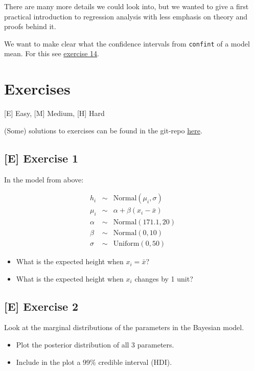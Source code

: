 \documentclass[
]{book}
\providecommand{\tightlist}{%
  \setlength{\itemsep}{0pt}\setlength{\parskip}{0pt}}
\begin{document}
There are many more details we could look into, but we wanted to give a first
practical introduction to regression analysis with less emphasis on theory and proofs behind it.

We want to make clear what the confidence intervals from \texttt{confint} of a model mean. For this see
\hyperref[exercise14_simpl_lin_reg]{exercise 14}.

\section{Exercises}\label{exercises-1}

{[}E{]} Easy, {[}M{]} Medium, {[}H{]} Hard

(Some) solutions to exercises can be found in the git-repo \href{https://github.com/jdegenfellner/Script_QM2_ZHAW/tree/main/Solutions_Exercises}{here}.

\subsection{{[}E{]} Exercise 1}\label{exercise1_simpl_lin_reg}

In the model from above:

\begin{eqnarray*}
h_i &\sim& \text{Normal}(\mu_i, \sigma)\\
\mu_i &\sim& \alpha + \beta (x_i - \bar{x})\\
\alpha &\sim& \text{Normal}(171.1, 20)\\
\beta &\sim& \text{Normal}(0, 10)\\
\sigma &\sim& \text{Uniform}(0, 50)
\end{eqnarray*}

\begin{itemize}
\tightlist
\item
  What is the expected height when \(x_i = \bar{x}\)?
\item
  What is the expected height when \(x_i\) changes by 1 unit?
\end{itemize}

\subsection{{[}E{]} Exercise 2}\label{exercise2_simpl_lin_reg}

Look at the marginal distributions of the parameters in the Bayesian model.

\begin{itemize}
\tightlist
\item
  Plot the posterior distribution of all 3 parameters.
\item
  Include in the plot a 99\% credible interval (HDI).
\end{itemize}
\end{document}
